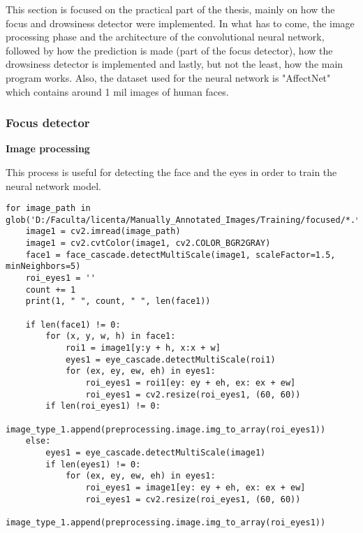 This section is focused on the practical part of the thesis, mainly on how the focus and drowsiness detector were implemented. In what has to come, the image processing phase and the architecture of the convolutional neural network, followed by how the prediction is made (part of the focus detector), how the drowsiness detector is implemented and lastly, but not the least, how the main program works. Also, the dataset used for the neural network is "AffectNet" which contains around 1 mil images of human faces. \par

\subsubsection{Focus detector} 

\vspace{2ex}
\textbf{Image processing} \par
\vspace{2ex}

This process is useful for detecting the face and the eyes in order to train the neural network model.

\begin{lstlisting}
for image_path in glob('D:/Faculta/licenta/Manually_Annotated_Images/Training/focused/*.*'):
    image1 = cv2.imread(image_path)
    image1 = cv2.cvtColor(image1, cv2.COLOR_BGR2GRAY)
    face1 = face_cascade.detectMultiScale(image1, scaleFactor=1.5, minNeighbors=5)
    roi_eyes1 = ''
    count += 1
    print(1, " ", count, " ", len(face1))

    if len(face1) != 0:
        for (x, y, w, h) in face1:
            roi1 = image1[y:y + h, x:x + w]
            eyes1 = eye_cascade.detectMultiScale(roi1)
            for (ex, ey, ew, eh) in eyes1:
                roi_eyes1 = roi1[ey: ey + eh, ex: ex + ew]
                roi_eyes1 = cv2.resize(roi_eyes1, (60, 60))
        if len(roi_eyes1) != 0:
            image_type_1.append(preprocessing.image.img_to_array(roi_eyes1))
    else:
        eyes1 = eye_cascade.detectMultiScale(image1)
        if len(eyes1) != 0:
            for (ex, ey, ew, eh) in eyes1:
                roi_eyes1 = image1[ey: ey + eh, ex: ex + ew]
                roi_eyes1 = cv2.resize(roi_eyes1, (60, 60))
            image_type_1.append(preprocessing.image.img_to_array(roi_eyes1))
\end{lstlisting}


